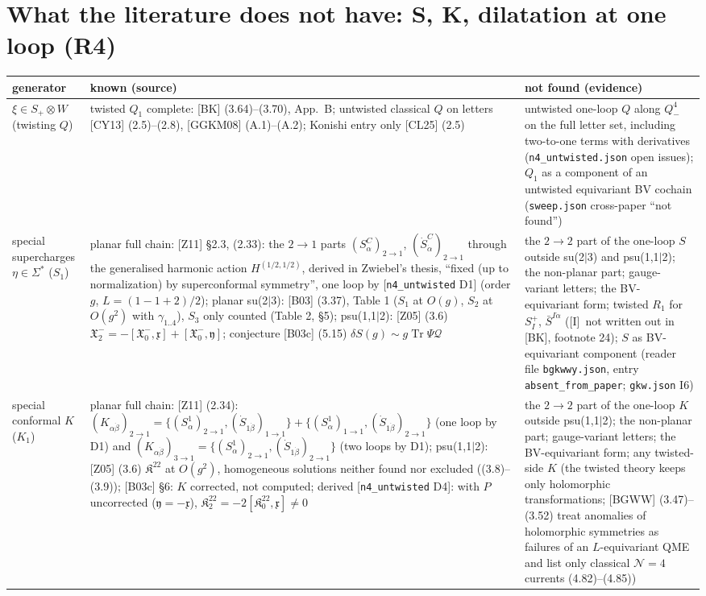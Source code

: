 \documentclass[11pt]{article}
\theoremstyle{definition}
\newcommand{\Tr}{\operatorname{Tr}}
\newcommand{\Il}{\textup{[I]}}
\begin{document}
\section{What the literature does not have: S, K, dilatation at one loop (R4)}

\begin{longtable}{p{2.6cm}p{6.6cm}p{6.6cm}}
\toprule
generator & known (source) & not found (evidence)\\
\midrule
$\xi\in S_+\otimes W$ (twisting $Q$) & twisted $Q_1$ complete: [BK] (3.64)--(3.70), App.~B; untwisted classical $Q$ on letters [CY13] (2.5)--(2.8), [GGKM08] (A.1)--(A.2); Konishi entry only [CL25] (2.5) & untwisted one-loop $Q$ along $Q^4_-$ on the full letter set, including two-to-one terms with derivatives (\texttt{n4\_untwisted.json} open issues); $Q_1$ as a component of an untwisted equivariant BV cochain (\texttt{sweep.json} cross-paper ``not found'')\\
special supercharges $\eta\in\Sigma^*$ ($S_1$) & planar full chain: [Z11] \S2.3, (2.33): the $2\to1$ parts $(S^C_\alpha)_{2\to1}$, $(\dot S^C_{\dot\alpha})_{2\to1}$ through the generalised harmonic action $H^{(1/2,1/2)}$, derived in Zwiebel's thesis, ``fixed (up to normalization) by superconformal symmetry'', one loop by [\texttt{n4\_untwisted} D1] (order $g$, $L=(1-1+2)/2$); planar su(2$|$3): [B03] (3.37), Table 1 ($S_1$ at $O(g)$, $S_2$ at $O(g^2)$ with $\gamma_{1..4}$), $S_3$ only counted (Table 2, \S5); psu(1,1$|$2): [Z05] (3.6) $\mathfrak X^-_2=-[\mathfrak X^-_0,\mathfrak x]+[\mathfrak X^-_0,\mathfrak y]$; conjecture [B03c] (5.15) $\delta S(g)\sim g\Tr\Psi\mathcal Q$ & the $2\to2$ part of the one-loop $S$ outside su(2$|$3) and psu(1,1$|$2); the non-planar part; gauge-variant letters; the BV-equivariant form; twisted $R_1$ for $S^+_I$, $\bar S^{I\dot\alpha}$ (\Il\ not written out in [BK], footnote 24); $S$ as BV-equivariant component (reader file \texttt{bgkwwy.json}, entry \texttt{absent\_from\_paper}; \texttt{gkw.json} I6)\\
special conformal $K$ ($K_1$) & planar full chain: [Z11] (2.34): $(K_{\alpha\dot\beta})_{2\to1}=\{(S^1_\alpha)_{2\to1},(\dot S_{1\dot\beta})_{1\to1}\}+\{(S^1_\alpha)_{1\to1},(\dot S_{1\dot\beta})_{2\to1}\}$ (one loop by D1) and $(K_{\alpha\dot\beta})_{3\to1}=\{(S^1_\alpha)_{2\to1},(\dot S_{1\dot\beta})_{2\to1}\}$ (two loops by D1); psu(1,1$|$2): [Z05] (3.6) $\mathfrak K^{22}$ at $O(g^2)$, homogeneous solutions neither found nor excluded ((3.8)--(3.9)); [B03c] \S6: $K$ corrected, not computed; derived [\texttt{n4\_untwisted} D4]: with $P$ uncorrected ($\mathfrak y=-\mathfrak x$), $\mathfrak K^{22}_2=-2[\mathfrak K^{22}_0,\mathfrak x]\neq0$ & the $2\to2$ part of the one-loop $K$ outside psu(1,1$|$2); the non-planar part; gauge-variant letters; the BV-equivariant form; any twisted-side $K$ (the twisted theory keeps only holomorphic transformations; [BGWW] (3.47)--(3.52) treat anomalies of holomorphic symmetries as failures of an $L$-equivariant QME and list only classical $\mathcal N=4$ currents (4.82)--(4.85))\\

\end{longtable}
\end{document}

